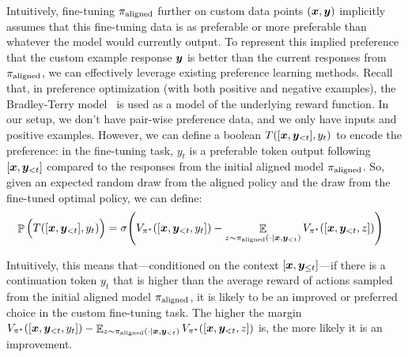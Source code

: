 Intuitively, fine-tuning $\pi_{\mathrm{aligned}}$ further on custom data points $(\bm{x}, \bm{y})$ implicitly assumes that this fine-tuning data is as preferable or more preferable than whatever the model would currently output.
To represent this implied preference that the custom example response $\bm{y}$ is better than the current responses from $\pi_{\mathrm{aligned}}$, we can effectively leverage existing preference learning methods.
Recall that, in preference optimization (with both positive and negative examples), the Bradley-Terry model~\cite{bradley1952rank} is used as a model of the underlying reward function. In our setup, we don't have pair-wise preference data, and we only have inputs and positive examples. However, we can define a boolean  $T([\bm{x}, \bm{y}_{<t}], y_t)$ to encode the preference: in the fine-tuning task, $y_t$ is a preferable token output following $[\bm{x}, \bm{y}_{<t}]$ compared to the responses from the initial aligned model $\pi_{\mathrm{aligned}}$. So, given an expected random draw from the aligned policy and the draw from the fine-tuned optimal policy, we can define:
\begin{align}
    & \mathop{\mathbb P}\Big(T([\bm{x}, \bm{y}_{<t}], y_t)\Big) = \sigma\Bigg( V_{\pi^*}([\bm{x}, \bm{y}_{<t}, y_t]) - 
 \mathop{\mathbb E}_{z \sim \pi_{\mathrm{aligned}}(\cdot |\bm{x}, \bm{y}_{<t} ) } V_{\pi^*}([\bm{x}, \bm{y}_{<t}, z])\Bigg)
\label{eqn:theoretical-token-wise-reward-model}
\end{align}

Intuitively, this means that---conditioned on the context $[\bm{x}, \bm{y}_{\le t}]$---if there is a
continuation token $y_t$ that is higher than the average reward of actions
sampled from the initial aligned model $\pi_{\mathrm{aligned}}$, it is likely to be an improved or preferred choice in the custom fine-tuning task. 
The higher the margin $V_{\pi^*}([\bm{x}, \bm{y}_{<t}, y_t]) - 
 \mathop{\mathbb E}_{z \sim \pi_{\mathrm{aligned}}(\cdot |\bm{x}, \bm{y}_{<t} ) } V_{\pi^*}([\bm{x}, \bm{y}_{<t}, z])$ is, the more likely it is an
improvement. 

